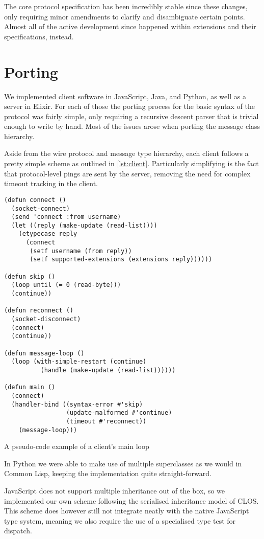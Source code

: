 \documentclass[format=sigconf]{acmart}
\begin{document}
The core protocol specification has been incredibly stable since these changes, only requiring minor amendments to clarify and disambiguate certain points. Almost all of the active development since happened within extensions and their specifications, instead.

\section{Porting}
We implemented client software in JavaScript, Java, and Python, as well as a server in Elixir. For each of those the porting process for the basic syntax of the protocol was fairly simple, only requiring a recursive descent parser that is trivial enough to write by hand. Most of the issues arose when porting the message class hierarchy.

Aside from the wire protocol and message type hierarchy, each client follows a pretty simple scheme as outlined in \autoref{lst:client}. Particularly simplifying is the fact that protocol-level pings are sent by the server, removing the need for complex timeout tracking in the client.

\begin{listing}
\begin{verbatim}
(defun connect ()
  (socket-connect)
  (send 'connect :from username)
  (let ((reply (make-update (read-list))))
    (etypecase reply
      (connect
       (setf username (from reply))
       (setf supported-extensions (extensions reply))))))

(defun skip ()
  (loop until (= 0 (read-byte)))
  (continue))

(defun reconnect ()
  (socket-disconnect)
  (connect)
  (continue))

(defun message-loop ()
  (loop (with-simple-restart (continue)
          (handle (make-update (read-list))))))

(defun main ()
  (connect)
  (handler-bind ((syntax-error #'skip)
                 (update-malformed #'continue)
                 (timeout #'reconnect))
    (message-loop)))
\end{verbatim}
\caption{A pseudo-code example of a client's main loop}
\label{lst:client}
\end{listing}

In Python we were able to make use of multiple superclasses as we would in Common Lisp, keeping the implementation quite straight-forward.

JavaScript does not support multiple inheritance out of the box, so we implemented our own scheme following the serialised inheritance model of CLOS. This scheme does however still not integrate neatly with the native JavaScript type system, meaning we also require the use of a specialised type test for dispatch.
\end{document}
